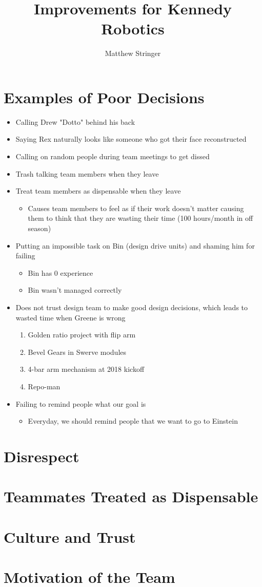 \documentclass[12pt]{article}
\title{Improvements for Kennedy Robotics} %
\author{Matthew Stringer} %
\theoremstyle{break}
\numberwithin{theorem}{subsection}
\numberwithin{lemma}{subsection}
\numberwithin{corollary}{subsection}
\numberwithin{equation}{subsection}
\begin{document}
\maketitle

\section{Examples of Poor Decisions}
\begin{itemize}
	\item Calling Drew "Dotto" behind his back
	\item Saying Rex naturally looks like someone who got their face reconstructed
	\item Calling on random people during team meetings to get dissed
	\item Trash talking team members when they leave
	\item Treat team members as dispensable when they leave
	\begin{itemize}
		\item Causes team members to feel as if their work doesn't matter causing them to think that
			they are wasting their time (100 hours/month in off season)
	\end{itemize}
	\item Putting an impossible task on Bin (design drive units) and shaming him for failing
	\begin{itemize}
		\item Bin has 0 experience 
		\item Bin wasn't managed correctly
	\end{itemize}
	\item Does not trust design team to make good design decisions, which leads to wasted time when
		Greene is wrong
	\begin{enumerate}
		\item Golden ratio project with flip arm
		\item Bevel Gears in Swerve modules
		\item 4-bar arm mechanism at 2018 kickoff 
		\item Repo-man
	\end{enumerate}
	\item Failing to remind people what our goal is
	\begin{itemize}
		\item Everyday, we should remind people that we want to go to Einstein
	\end{itemize}
\end{itemize}

\section{Disrespect}

\section{Teammates Treated as Dispensable}

\section{Culture and Trust}

\section{Motivation of the Team}
\end{document}
